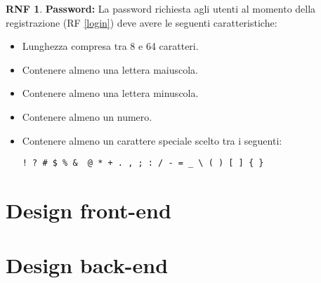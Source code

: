 \documentclass[11pt, a4paper]{article}
\theoremstyle{definition}
\newtheorem{nonfuncreq}{RNF} %
\begin{document}
\begin{nonfuncreq}
\textbf{Password:}
La password richiesta agli utenti al momento della registrazione
(RF \ref{login}) deve avere le seguenti caratteristiche:
\begin{itemize}
    \item Lunghezza compresa tra 8 e 64 caratteri.
    \item Contenere almeno una lettera maiuscola.
    \item Contenere almeno una lettera minuscola.
    \item Contenere almeno un numero.
    \item Contenere almeno un carattere speciale scelto tra i
    seguenti:
    \begin{center}
        \verb|! ? # $ % &  @ * + . , ; : / - = _ \ ( ) [ ] { }|
    \end{center}
\end{itemize}
\end{nonfuncreq}



\newpage
\section{Design front-end}

\section{Design back-end}
\end{document}
